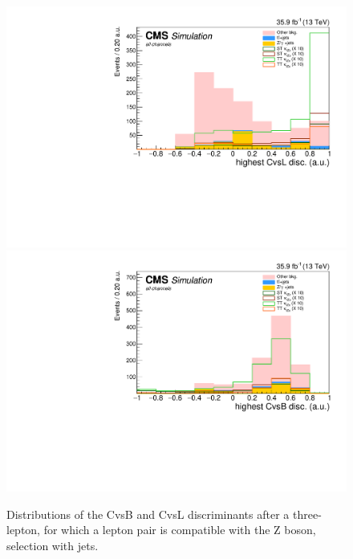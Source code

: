 \begin{figure}[htbp]
	\includegraphics[width=0.3\linewidth]{7_Conclusion/Figures/charmtagging/3lepcontrol_dilep_CvsLdiscHigh_all_Stack}
	\includegraphics[width=0.3\linewidth]{7_Conclusion/Figures/charmtagging/3lepcontrol_dilep_CvsBdiscHigh_all_Stack}
	\caption{Distributions of the CvsB and CvsL discriminants after a three-lepton, for which a lepton pair is compatible with the Z boson, selection with jets.}
	\label{fig:ctagging}
\end{figure}



